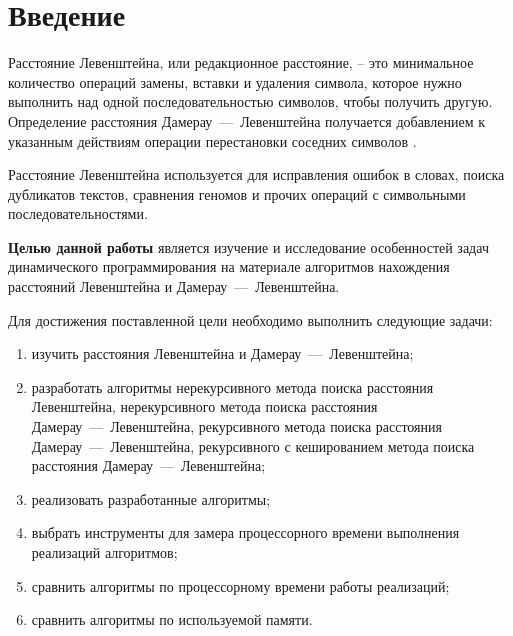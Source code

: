 \chapter*{Введение}

Расстояние Левенштейна, или редакционное расстояние, -- это минимальное количество операций замены, вставки и удаления символа, которое нужно выполнить над одной последовательностью символов, чтобы получить другую. Определение расстояния Дамерау~---~Левенштейна получается добавлением к указанным действиям операции перестановки соседних символов \cite{lev}.

Расстояние Левенштейна используется для исправления ошибок в словах, поиска дубликатов текстов, сравнения геномов и прочих операций с символьными последовательностями.

\textbf{Целью данной работы} является  изучение и исследование особенностей задач динамического программирования на материале алгоритмов нахождения расстояний Левенштейна и Дамерау~---~Левенштейна.

Для достижения поставленной цели необходимо выполнить следующие
задачи:
\begin{enumerate}[label={\arabic*)}]
    \item изучить расстояния Левенштейна и Дамерау~---~Левенштейна;
    \item разработать алгоритмы нерекурсивного метода поиска расстояния Левенштейна, нерекурсивного метода поиска расстояния Дамерау~---~Левенштейна, рекурсивного метода поиска расстояния Дамерау~---~Левенштейна, рекурсивного с кешированием метода поиска расстояния Дамерау~---~Левенштейна;
    \item реализовать разработанные алгоритмы;
    \item выбрать инструменты для замера процессорного времени выполнения реализаций алгоритмов;
    \item сравнить алгоритмы по процессорному времени работы реализаций;
    \item сравнить алгоритмы по используемой памяти.
\end{enumerate}
